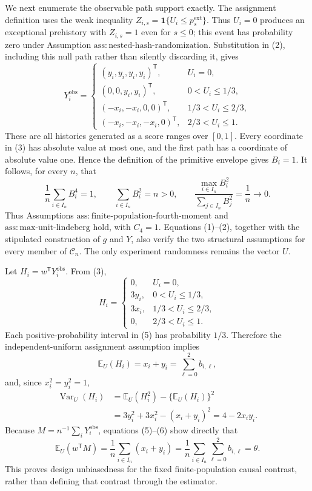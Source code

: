 We next enumerate the observable path support exactly.  The assignment definition uses the weak inequality \(Z_{i,s}=\mathbf 1\{U_i\le p_s^{\mathrm{ext}}\}\).  Thus \(U_i=0\) produces an exceptional prehistory with \(Z_{i,s}=1\) even for \(s\le0\); this event has probability zero under Assumption \(\mathrm{ass:nested\text{-}hash\text{-}randomization}\).  Substitution in (2), including this null path rather than silently discarding it, gives
\[
Y_i^{\mathrm{obs}}=
\begin{cases}
(y_i,y_i,y_i,y_i)^{\mathsf T},&U_i=0,\\
(0,0,y_i,y_i)^{\mathsf T},&0<U_i\le1/3,\\
(-x_i,-x_i,0,0)^{\mathsf T},&1/3<U_i\le2/3,\\
(-x_i,-x_i,-x_i,0)^{\mathsf T},&2/3<U_i\le1.
\end{cases}
\tag{3}
\]
These are all histories generated as a score ranges over \([0,1]\).  Every coordinate in (3) has absolute value at most one, and the first path has a coordinate of absolute value one.  Hence the definition of the primitive envelope gives \(B_i=1\).  It follows, for every \(n\), that
\[
\frac1n\sum_{i\in I_n}B_i^4=1,
\qquad
\sum_{i\in I_n}B_i^2=n>0,
\qquad
\frac{\max_{i\in I_n}B_i^2}{\sum_{j\in I_n}B_j^2}
=\frac1n\longrightarrow0.
\tag{4}
\]
Thus Assumptions \(\mathrm{ass:finite\text{-}population\text{-}fourth\text{-}moment}\) and \(\mathrm{ass:max\text{-}unit\text{-}lindeberg}\) hold, with \(C_4=1\).  Equations (1)--(2), together with the stipulated construction of \(g\) and \(Y\), also verify the two structural assumptions for every member of \(\mathcal C_n\).  The only experiment randomness remains the vector \(U\).

Let \(H_i=w^{\mathsf T}Y_i^{\mathrm{obs}}\).  From (3),
\[
H_i=
\begin{cases}
0,&U_i=0,\\
3y_i,&0<U_i\le1/3,\\
3x_i,&1/3<U_i\le2/3,\\
0,&2/3<U_i\le1.
\end{cases}
\tag{5}
\]
Each positive-probability interval in (5) has probability \(1/3\).  Therefore the independent-uniform assignment assumption implies
\[
\mathbb E_U(H_i)=x_i+y_i=\sum_{\ell=0}^2b_{i,\ell},
\tag{6}
\]
and, since \(x_i^2=y_i^2=1\),
\[
\begin{aligned}
\operatorname{Var}_U(H_i)
&=\mathbb E_U(H_i^2)-\{\mathbb E_U(H_i)\}^2\\
&=3y_i^2+3x_i^2-(x_i+y_i)^2
=4-2x_i y_i.
\end{aligned}
\tag{7}
\]
Because \(M=n^{-1}\sum_iY_i^{\mathrm{obs}}\), equations (5)--(6) show directly that
\[
\mathbb E_U(w^{\mathsf T}M)
=\frac1n\sum_{i\in I_n}(x_i+y_i)
=\frac1n\sum_{i\in I_n}\sum_{\ell=0}^2b_{i,\ell}
=\theta.
\tag{8}
\]
This proves design unbiasedness for the fixed finite-population causal contrast, rather than defining that contrast through the estimator.

